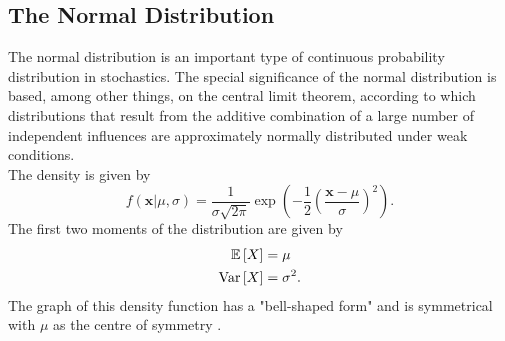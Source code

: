 \subsection{The Normal Distribution}
The normal distribution is an important type of continuous probability distribution in stochastics. The special significance of the normal distribution is based, among other things, on the central limit theorem, according to which distributions that result from the additive combination of a large number of independent influences are approximately normally distributed under weak conditions. \\
The density is given by
\begin{equation}
    f\left(\pmb{x}|\mu,\sigma\right)=\frac{1}{\sigma\sqrt{2\pi}}\exp\left(-\frac{1}{2}\left(\frac{\pmb{x}-\mu}{\sigma}\right)^2\right).
\end{equation}
The first two moments of the distribution are given by
\begin{align}
    \mathbb{E}\left[X\right] &= \mu \\
    \hbox{Var}\left[X\right] &= \sigma^2.
\end{align}
The graph of this density function has a "bell-shaped form" and is symmetrical with $\mu$ as the centre of symmetry \autocite[][83-85]{fahrmeir2016statistik}.
